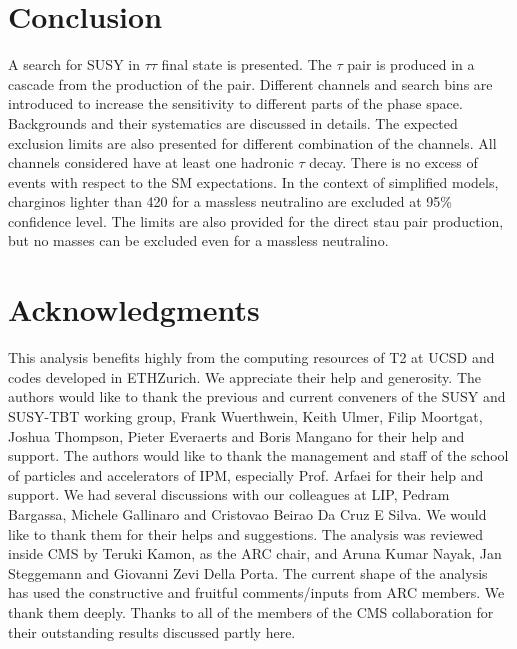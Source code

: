 \section{Conclusion}
\label{sect:conclusion}
A search for SUSY in $\tau\tau$ final state is presented. The $\tau$ pair is produced in a cascade from the production of the \PSGcpDo pair.
Different channels and search bins are introduced to increase the sensitivity to different parts of the phase space. 
Backgrounds and their systematics are discussed in details. 
The expected exclusion limits are also presented for different combination of the channels.
All channels considered have at least one hadronic $\tau$ decay.
There is no excess of events with respect to the SM expectations.
In the context of simplified models, charginos lighter than 420 \GeV 
for a massless neutralino  are excluded at 95\% confidence level.
The limits are also provided for the direct stau pair production, but no masses  can be excluded 
even for a massless neutralino.


\section{Acknowledgments}
This analysis benefits highly from the computing resources of T2 at UCSD and codes developed in ETHZurich. 
We appreciate their help and generosity.
The authors would like to thank the previous and current conveners of the SUSY and SUSY-TBT working group, Frank Wuerthwein, Keith Ulmer, Filip Moortgat, Joshua Thompson, Pieter Everaerts and Boris Mangano for their help and support. 
The authors would like to thank the management and staff of the school of particles 
and accelerators of IPM, especially Prof. Arfaei for their help and support. 
We had several discussions with our colleagues at LIP, Pedram Bargassa, Michele Gallinaro and Cristovao Beirao Da Cruz E Silva. 
We would like to thank them for their helps and suggestions.
The analysis was reviewed inside CMS by Teruki Kamon, as the ARC chair, and Aruna Kumar Nayak, Jan Steggemann and Giovanni Zevi Della Porta. 
The current shape of the analysis has used the constructive and fruitful comments/inputs from ARC members. We thank them deeply.
Thanks to all of the members of
the CMS collaboration for their outstanding results discussed partly here.
